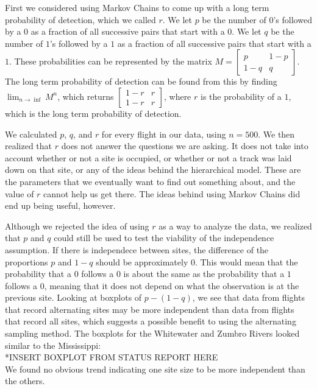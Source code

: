 \documentclass{article}
\begin{document}
		First we considered using Markov Chains to come up with a long term 
probability of detection, which we called \(r\).  We let \(p\) be the number of 
\(0\)'s followed by a \(0\) as a fraction of all successive pairs that start 
with a \(0\).  We let \(q\) be the number of \(1\)'s followed by a \(1\) as a 
fraction of all successive pairs that start with a \(1\).  These probabilities 
can be represented by the matrix \(M = \begin{bmatrix} p & 1-p \\ 1-q & q 
\end{bmatrix}\). The long term probability of detection can be found from this 
by finding \(\lim_{n \to \inf} M^n\), which returns \( \begin{bmatrix} 1-r & r 
\\ 1-r & r\end{bmatrix}\), where \(r\) is the probability of a \(1\), which is 
the long term probability of detection.  

	We calculated \(p\), \(q\), and \(r\) for every flight in our data, using 
\(n = 500\).  We then realized that \(r\) does not answer the questions we are 
asking.  It does not take into account whether or not a site is occupied, or 
whether or not a track was laid down on that site, or any of the ideas behind    
the hierarchical model.  These are the parameters that we eventually want to 
find out something about, and the value of \(r\) cannot help us get there.  The 
ideas behind using Markov Chains did end up being useful, however.  
	
	Although we rejected the idea of using \(r\) as a way to analyze the data, 
we realized that \(p\) and \(q\) could still be used to test the viability of 
the independence assumption.  If there is independece between sites, the 
difference of the proportions \(p\) and \(1-q\) should be approximately \(0\). 
This would mean that the probability that a \(0\) follows a \(0\) is about the 
same as the probability that a \(1\) follows a \(0\), meaning that it does not 
depend on what the observation is at the previous site.  Looking at boxplots of 
\(p - (1-q)\), we see that data from flights that record alternating sites may 
be more independent than data from flights that record all sites, which suggests
a possible benefit to using the alternating sampling method.  The boxplots for 
the Whitewater and Zumbro Rivers looked similar to the Mississippi:  \\
*INSERT BOXPLOT FROM STATUS REPORT HERE  \\
We found no obvious trend indicating one site size to be more independent than 
the others.  
\end{document}

